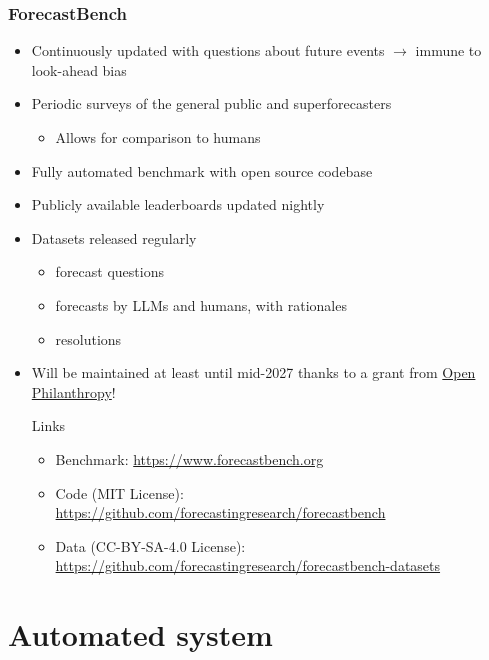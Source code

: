 \documentclass[aspectratio=169]{beamer}
\begin{document}
\begin{frame}
  \frametitle{ForecastBench}
  \begin{itemize}
  \item Continuously updated with questions about future events $\rightarrow$ immune to look-ahead bias
  \item Periodic surveys of the general public and superforecasters
    \begin{itemize}
    \item Allows for comparison to humans
    \end{itemize}
  \item Fully automated benchmark with open source codebase
  \item Publicly available leaderboards updated nightly
  \item Datasets released regularly
    \begin{itemize}
    \item forecast questions
    \item forecasts by LLMs and humans, with rationales
    \item resolutions
    \end{itemize}
  \item Will be maintained at least until mid-2027 thanks to a grant from \href{https://www.openphilanthropy.org/}{Open Philanthropy}!
    \begin{block}{Links}
      \begin{itemize}
      \item Benchmark: \href{https://www.forecastbench.org/}{https://www.forecastbench.org}
      \item Code (MIT License): \href{https://github.com/forecastingresearch/forecastbench}{https://github.com/forecastingresearch/forecastbench}
      \item Data (CC-BY-SA-4.0 License): \href{https://github.com/forecastingresearch/forecastbench-datasets}{https://github.com/forecastingresearch/forecastbench-datasets}
      \end{itemize}
    \end{block}
  \end{itemize}
\end{frame}


\section{Automated system}
\end{document}
